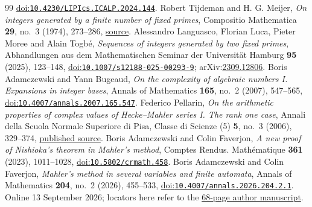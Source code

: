 \begin{thebibliography}{99}
  \href{https://doi.org/10.4230/LIPIcs.ICALP.2024.144}{doi:\nolinkurl{10.4230/LIPIcs.ICALP.2024.144}}.
 Robert Tijdeman and H. G. Meijer,
  \emph{On integers generated by a finite number of fixed primes}, Compositio Mathematica \textbf{29}, no.~3 (1974), 273--286,
  \href{https://www.numdam.org/article/CM_1974__29_3_273_0.pdf}{source}.
 Alessandro Languasco, Florian Luca, Pieter Moree and Alain Togb\'{e},
  \emph{Sequences of integers generated by two fixed primes}, Abhandlungen aus dem Mathematischen Seminar der Universität Hamburg \textbf{95} (2025), 123--148,
  \href{https://doi.org/10.1007/s12188-025-00293-9}{doi:\nolinkurl{10.1007/s12188-025-00293-9}}; arXiv:\href{https://arxiv.org/abs/2309.12806}{2309.12806}.
 Boris Adamczewski and Yann Bugeaud,
  \emph{On the complexity of algebraic numbers I. Expansions in integer bases},
  Annals of Mathematics \textbf{165}, no.~2 (2007), 547--565,
  \href{https://doi.org/10.4007/annals.2007.165.547}{doi:\nolinkurl{10.4007/annals.2007.165.547}}.
 Federico Pellarin,
  \emph{On the arithmetic properties of complex values of Hecke--Mahler series I.
  The rank one case}, Annali della Scuola Normale Superiore di Pisa,
  Classe di Scienze (5) \textbf{5}, no.~3 (2006), 329--374,
  \href{https://www.numdam.org/item/ASNSP_2006_5_5_3_329_0/}{published source}.
 Boris Adamczewski and Colin Faverjon,
  \emph{A new proof of Nishioka's theorem in Mahler's method},
  Comptes Rendus. Math\'ematique \textbf{361} (2023), 1011--1028,
  \href{https://doi.org/10.5802/crmath.458}{doi:\nolinkurl{10.5802/crmath.458}}.
 Boris Adamczewski and Colin Faverjon,
  \emph{Mahler's method in several variables and finite automata},
  Annals of Mathematics \textbf{204}, no.~2 (2026), 455--533,
  \href{https://doi.org/10.4007/annals.2026.204.2.1}{doi:\nolinkurl{10.4007/annals.2026.204.2.1}}.
  Online 13 September 2026; locators here refer to the
  \href{https://faverjon.perso.math.cnrs.fr/AdamczewskiFaverjon_MahlerFiniteAutomata.pdf}{68-page author manuscript}.
\end{thebibliography}
